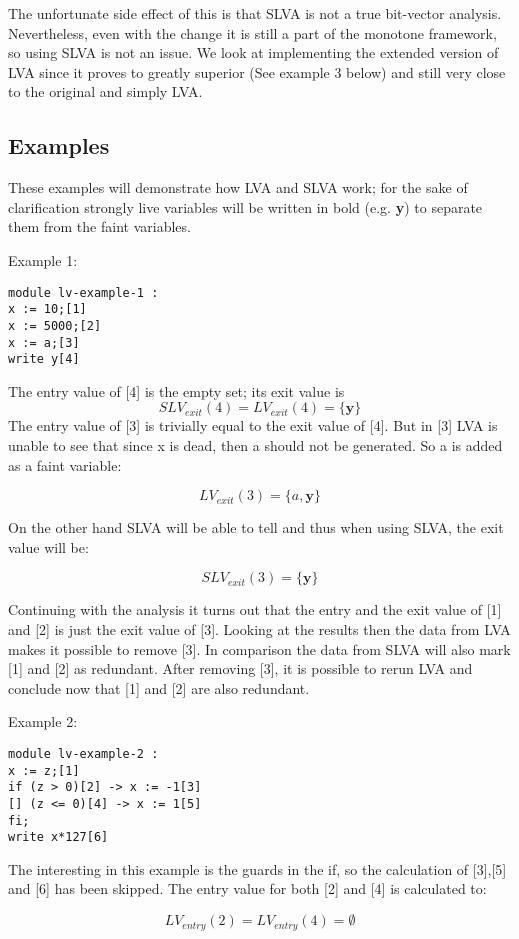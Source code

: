 \docpar
The unfortunate side effect of this is that SLVA is not a true bit-vector
analysis. Nevertheless, even with the change it is still a part of the
monotone framework, so using SLVA is not an issue.
  We look at implementing the extended version of LVA since it proves to
greatly superior (See example 3 below) and still very close to the original
and simply LVA.

\subsection{Examples}
These examples will demonstrate how LVA and SLVA work; for the sake of
clarification strongly live variables will be written in bold
(e.g. \textbf{y}) to separate them from the faint variables.

\docpar
Example 1:
\begin{lstlisting}
module lv-example-1 :
x := 10;[1]
x := 5000;[2]
x := a;[3]
write y[4]
\end{lstlisting}
The entry value of [4] is the empty set; its
exit value is
\[ SLV_{exit}(4) = LV_{exit}(4) = \{\textbf{y}\}\]
The entry value of [3] is trivially equal to the
exit value of [4]. But in [3] LVA is unable to see
that since x is dead, then a should not be
generated. So a is added as a faint variable:

\[LV_{exit}(3) = \{a, \textbf{y}\}\]

On the other hand SLVA will be able to tell and thus
when using SLVA, the exit value will be:

\[SLV_{exit}(3) = \{\textbf{y}\}\]

Continuing with the analysis it turns out that the
entry and the exit value of [1] and [2] is just the
exit value of [3]. Looking at the results then the
data from LVA makes it possible to remove [3].
In comparison the data from SLVA will also mark [1]
and [2] as redundant.
  After removing [3], it is possible to rerun LVA
and conclude now that [1] and [2] are also redundant.

\docpar
Example 2:
\begin{lstlisting}
module lv-example-2 :
x := z;[1]
if (z > 0)[2] -> x := -1[3]
[] (z <= 0)[4] -> x := 1[5]
fi;
write x*127[6]
\end{lstlisting}

The interesting in this example is the guards in the if,
so the calculation of [3],[5] and [6] has been skipped.
The entry value for both [2] and [4] is calculated to:

\[LV_{entry}(2) = LV_{entry}(4) = \emptyset \]


